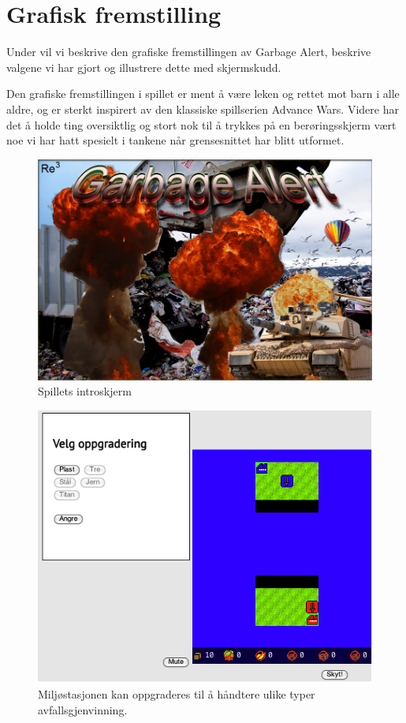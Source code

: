 \section{Grafisk fremstilling}\label{sec:artwork}
Under vil vi beskrive den grafiske fremstillingen av Garbage Alert, beskrive valgene vi har gjort og illustrere dette med skjermskudd.

Den grafiske fremstillingen i spillet er ment å være leken og rettet mot barn i alle aldre, og er sterkt inspirert av den klassiske spillserien Advance Wars. Videre har det å holde ting oversiktlig og stort nok til å trykkes på en berøringsskjerm vært noe vi har hatt spesielt i tankene når grensesnittet har blitt utformet.


\begin{figure}
\centering
\includegraphics[width=\textwidth]{images/splashscreen.png}
\caption{Spillets introskjerm}
\label{fig:splashscreen}
\end{figure}

\begin{figure}
\centering
\includegraphics[width=\textwidth]{images/Oppgradering.png}
\caption{Miljøstasjonen kan oppgraderes til å håndtere ulike typer avfallsgjenvinning.}
\label{fig:Oppgradering}
\end{figure}

